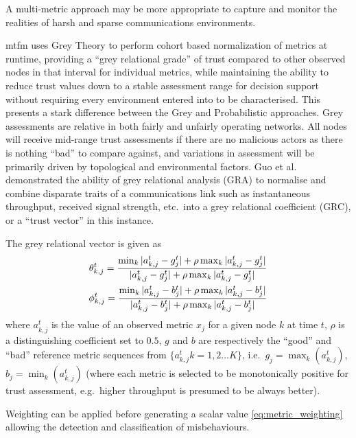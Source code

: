 A multi-metric approach may be more appropriate to capture and monitor the realities of harsh and sparse communications environments.

\gls{mtfm}\cite{Guo11} uses Grey Theory\cite{Zuo1995} to perform cohort based normalization of metrics at runtime, providing a ``grey relational grade'' of trust compared to other observed nodes in that interval for individual metrics, while maintaining the ability to reduce trust values down to a stable assessment range for decision support without requiring every environment entered into to be characterised.
This presents a stark difference between the Grey and Probabilistic approaches.
Grey assessments are relative in both fairly and unfairly operating networks.
All nodes will receive mid-range trust assessments if there are no malicious actors as there is nothing ``bad'' to compare against, and variations in assessment will be primarily driven by topological and environmental factors.
Guo et al.\cite{Guo11} demonstrated the ability of grey relational analysis (GRA) to normalise and combine disparate traits of a communications link such as instantaneous throughput, received signal strength, etc.\ into a grey relational coefficient (GRC), or a ``trust vector'' in this instance.

The grey relational vector is given as
%
\begin{align}
  \label{eq:grc}
  \theta_{k,j}^t = \frac{\min_k|a_{k,j}^t - g_j^t| + \rho \max_k|a_{k,j}^t-g_j^t|}{|a_{k,j}^t-g_j^t| + \rho \max_k|a_{k,j}^t-g_j^t|} \\
  \phi_{k,j}^t = \frac{\min_k|a_{k,j}^t - b_j^t| + \rho \max_k|a_{k,j}^t-b_j^t|}{|a_{k,j}^t-b_j^t| + \rho \max_k|a_{k,j}^t-b_j^t|} \notag 
\end{align}
%
where $a_{k,j}^t$ is the value of an observed metric $x_j$ for a given node $k$ at time $t$, $\rho$ is a distinguishing coefficient set to $0.5$, $g$ and $b$ are respectively the ``good'' and ``bad'' reference metric sequences from $\{a_{k,j}^t k=1,2\dots K\}$, i.e.\ $g_j=\max_k({a_{k,j}^t})$,  $b_j=\min_k({a_{k,j}^t})$ (where each metric is selected to be monotonically positive for trust assessment, e.g.\ higher throughput is presumed to be always better).

Weighting can be applied before generating a scalar value \eqref{eq:metric_weighting} allowing the detection and classification of misbehaviours.

